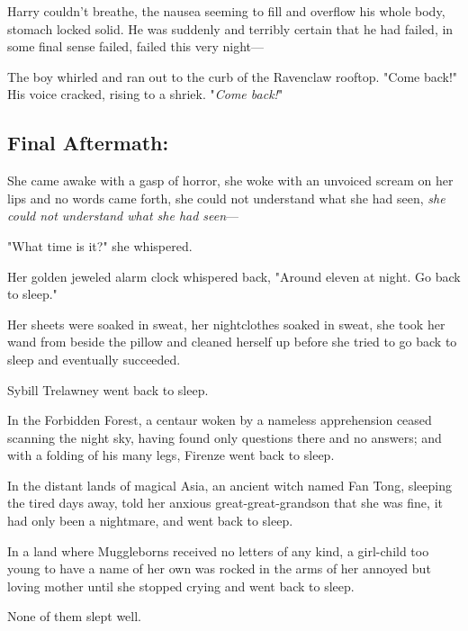 Harry couldn't breathe, the nausea seeming to fill and overflow his whole body, 
stomach locked solid. He was suddenly and terribly certain that he had failed, 
in some final sense failed, failed this very night---

The boy whirled and ran out to the curb of the Ravenclaw rooftop. "Come back!" 
His voice cracked, rising to a shriek. "\emph{Come back!}"
\sbreak
\subsection{Final Aftermath:}

She came awake with a gasp of horror, she woke with an unvoiced scream on her 
lips and no words came forth, she could not understand what she had seen, 
\emph{she could not understand what she had seen}---

"What time is it?" she whispered.

Her golden jeweled alarm clock whispered back, "Around eleven at night. Go back 
to sleep."

Her sheets were soaked in sweat, her nightclothes soaked in sweat, she took her 
wand from beside the pillow and cleaned herself up before she tried to go back 
to sleep and eventually succeeded.

Sybill Trelawney went back to sleep.

In the Forbidden Forest, a centaur woken by a nameless apprehension ceased 
scanning the night sky, having found only questions there and no answers; and 
with a folding of his many legs, Firenze went back to sleep.

In the distant lands of magical Asia, an ancient witch named Fan Tong, sleeping 
the tired days away, told her anxious great-great-grandson that she was fine, 
it had only been a nightmare, and went back to sleep.

In a land where Muggleborns received no letters of any kind, a girl-child too 
young to have a name of her own was rocked in the arms of her annoyed but 
loving mother until she stopped crying and went back to sleep.

None of them slept well.
